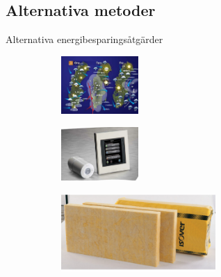 \subsection{Alternativa metoder}

\begin{frame}{Alternativa energibesparingsåtgärder}

\begin{figure}[hpbt]
\begin{subfigure}{0.45\textwidth}
\flushright
	\includegraphics[width=111px]{images/prognos.eps}
\end{subfigure}
\begin{subfigure}{0.45\textwidth}
\flushleft
	\includegraphics[width=111px]{images/termostat.eps}
\end{subfigure}

\begin{subfigure}{\textwidth}
\centering
	\includegraphics[width=222px]{images/isolering.eps}
\end{subfigure}

\end{figure}
\end{frame}

